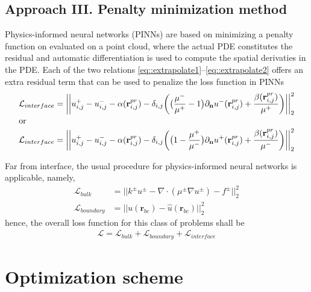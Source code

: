 \documentclass{elsarticle}
\begin{document}
\subsection{Approach III. Penalty minimization method}
Physics-informed neural networks (PINNs) are based on minimizing a penalty function on evaluated on a point cloud, where the actual PDE constitutes the residual and automatic differentiation is used to compute the spatial derivaties in the PDE. Each of the two relations \ref{eq::extrapolate1}--\ref{eq::extrapolate2} offers an extra residual term that can be used to penalize the loss function in PINNs
\begin{align}
\mathcal{L}_{interface} &= \bigg|\bigg| u^+_{i,j} - u^-_{i,j} - \alpha(\mathbf{r}_{i,j}^{pr}) - \delta_{i,j}\bigg(\big(\frac{\mu^-}{\mu^+}-1\big)\partial_\mathbf{n}u^-(\mathbf{r}^{pr}_{i,j}) + \frac{\beta(\mathbf{r}_{i,j}^{pr})}{\mu^+} \bigg) \bigg|\bigg|_2^2 \\
\intertext{or}
\mathcal{L}_{interface} &= \bigg|\bigg| u^+_{i,j} - u^-_{i,j} - \alpha(\mathbf{r}_{i,j}^{pr}) - \delta_{i,j}\bigg(\big(1-\frac{\mu^+}{\mu^-}\big)\partial_\mathbf{n}u^+(\mathbf{r}^{pr}_{i,j}) + \frac{\beta(\mathbf{r}_{i,j}^{pr})}{\mu^-} \bigg) \bigg|\bigg|_2^2
 \label{eq::interfaceLoss}
\end{align}


Far from interface, the usual procedure for physics-informed neural networks is applicable, namely,
\begin{align*}
\mathcal{L}_{bulk} &= \bigg|\bigg| k^{\pm}u^{\pm} - \nabla \cdot (\mu^{\pm}\nabla u^\pm) - f^{\pm} \bigg|\bigg|_2^2 \\
\mathcal{L}_{boundary} &= \bigg|\bigg|u(\mathbf{r}_{bc}) - \hat{u}(\mathbf{r}_{bc})\bigg|\bigg|_2^2
\end{align*}
hence, the overall loss function for this class of problems shall be
\begin{align*}
\mathcal{L} = \mathcal{L}_{bulk} + \mathcal{L}_{boundary} + \mathcal{L}_{interface}
\end{align*}



\section{Optimization scheme}
\end{document}
